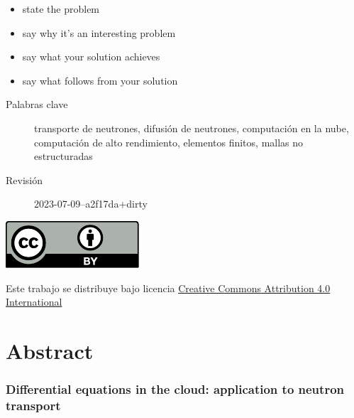 \documentclass[
  12pt,
  a4paper,
  table]{scrbook}
\providecommand{\tightlist}{%
  \setlength{\itemsep}{0pt}\setlength{\parskip}{0pt}}\usepackage{longtable,booktabs,array}
\theoremstyle{plain}
\theoremstyle{definition}
\theoremstyle{plain}
\theoremstyle{plain}
\theoremstyle{remark}
\begin{document}
\vspace{0.75cm plus 0.5cm}

\begin{itemize}
\tightlist
\item
  state the problem
\item
  say why it's an interesting problem
\item
  say what your solution achieves
\item
  say what follows from your solution
\end{itemize}

\vspace{\fill}

\begin{description}
\item[Palabras clave]
transporte de neutrones, difusión de neutrones, computación en la nube,
computación de alto rendimiento, elementos finitos, mallas no
estructuradas
\item[Revisión]
2023-07-09--a2f17da+dirty
\end{description}

\vspace{1.5cm plus 0.5cm minus 0.5cm}

\begin{centering}

\includegraphics{front/by.pdf}

Este trabajo se distribuye bajo licencia
\href{http://creativecommons.org/licenses/by/4.0/\%22}{Creative Commons
Attribution 4.0 International}

\end{centering}


\hypertarget{abstract}{%
\chapter*{\texorpdfstring{\foreignlanguage{american}{Abstract}}{Abstract}}\label{abstract}}


\vspace{1cm plus 0.5cm}

\hypertarget{meta-title-en}{%
\subsection*{\texorpdfstring{\foreignlanguage{american}{Differential
equations in the cloud: application to neutron
transport}}{Differential equations in the cloud: application to neutron transport}}\label{meta-title-en}}
\end{document}
